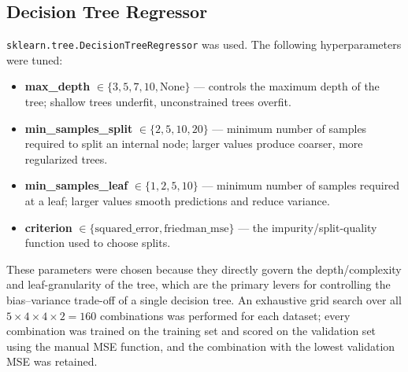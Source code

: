 \documentclass[11pt]{article}
\begin{document}
\subsection{Decision Tree Regressor}
\texttt{sklearn.tree.DecisionTreeRegressor} was used. The following hyperparameters were tuned:
\begin{itemize}
  \item \textbf{max\_depth} $\in \{3, 5, 7, 10, \text{None}\}$ --- controls the maximum depth of the tree; shallow trees underfit, unconstrained trees overfit.
  \item \textbf{min\_samples\_split} $\in \{2, 5, 10, 20\}$ --- minimum number of samples required to split an internal node; larger values produce coarser, more regularized trees.
  \item \textbf{min\_samples\_leaf} $\in \{1, 2, 5, 10\}$ --- minimum number of samples required at a leaf; larger values smooth predictions and reduce variance.
  \item \textbf{criterion} $\in \{\text{squared\_error}, \text{friedman\_mse}\}$ --- the impurity/split-quality function used to choose splits.
\end{itemize}
These parameters were chosen because they directly govern the depth/complexity and leaf-granularity of the tree, which are the primary levers for controlling the bias--variance trade-off of a single decision tree. An exhaustive grid search over all $5\times4\times4\times2 = 160$ combinations was performed for each dataset; every combination was trained on the training set and scored on the validation set using the manual MSE function, and the combination with the lowest validation MSE was retained.
\end{document}
